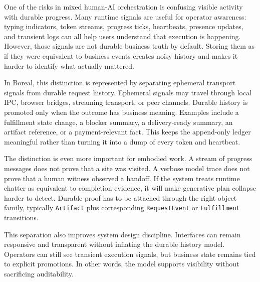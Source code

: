 One of the risks in mixed human-AI orchestration is confusing visible activity with durable progress. Many runtime signals are useful for operator awareness: typing indicators, token streams, progress ticks, heartbeats, presence updates, and transient logs can all help users understand that execution is happening. However, those signals are not durable business truth by default. Storing them as if they were equivalent to business events creates noisy history and makes it harder to identify what actually mattered.

In Boreal, this distinction is represented by separating ephemeral transport signals from durable request history. Ephemeral signals may travel through local IPC, browser bridges, streaming transport, or peer channels. Durable history is promoted only when the outcome has business meaning. Examples include a fulfillment state change, a blocker summary, a delivery-ready summary, an artifact reference, or a payment-relevant fact. This keeps the append-only ledger meaningful rather than turning it into a dump of every token and heartbeat.

The distinction is even more important for embodied work. A stream of progress messages does not prove that a site was visited. A verbose model trace does not prove that a human witness observed a handoff. If the system treats runtime chatter as equivalent to completion evidence, it will make generative plan collapse harder to detect. Durable proof has to be attached through the right object family, typically \texttt{Artifact} plus corresponding \texttt{RequestEvent} or \texttt{Fulfillment} transitions.

This separation also improves system design discipline. Interfaces can remain responsive and transparent without inflating the durable history model. Operators can still see transient execution signals, but business state remains tied to explicit promotions. In other words, the model supports visibility without sacrificing auditability.

